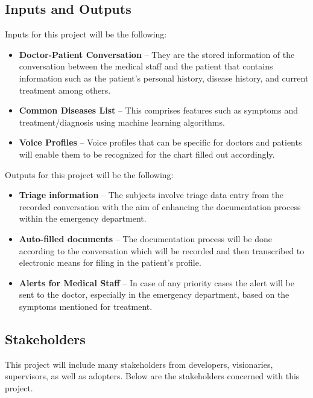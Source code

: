 \documentclass{article}
\begin{document}
\subsection{Inputs and Outputs}
Inputs for this project will be the following:

\begin{itemize}
    \item \textbf{Doctor-Patient Conversation} -- They are the stored information of the conversation between the medical staff and the patient that contains information such as the patient’s personal history, disease history, and current treatment among others.
    \item \textbf{Common Diseases List} -- This comprises features such as symptoms and treatment/diagnosis using machine learning algorithms.
    \item \textbf{Voice Profiles} -- Voice profiles that can be specific for doctors and patients will enable them to be recognized for the chart filled out accordingly. 
\end {itemize}

Outputs for this project will be the following: 

\begin{itemize} 
    \item \textbf{Triage information} -- The subjects involve triage data entry from the recorded conversation with the aim of enhancing the documentation process within the emergency department.
    \item \textbf{Auto-filled documents} -- The documentation process will be done according to the conversation which will be recorded and then transcribed to electronic means for filing in the patient’s profile.
    \item \textbf{Alerts for Medical Staff} -- In case of any priority cases the alert will be sent to the doctor, especially in the emergency department, based on the symptoms mentioned for treatment.
\end{itemize}


\subsection{Stakeholders}

This project will include many stakeholders from developers, visionaries, supervisors, as well as adopters. Below are the stakeholders concerned with this project.
\end{document}
